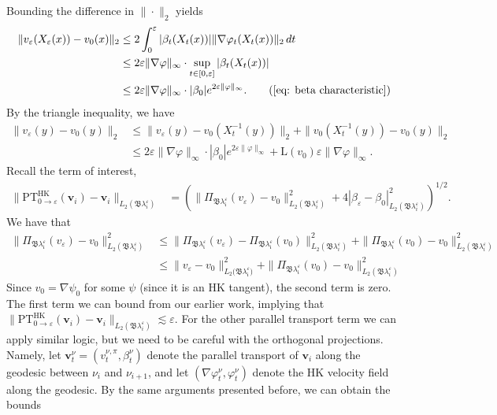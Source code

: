 \documentclass[11pt]{article}
\begin{document}
Bounding the difference in $\|\cdot\|_2$ yields
\begin{align*}
    \|v_\varepsilon(X_\varepsilon(x)) - v_0(x)\|_2 &\leq 2\int_0^\varepsilon|\beta_t(X_t(x))|\|\nabla\varphi_t(X_t(x))\|_2 \,dt \\
    &\leq 2\varepsilon \|\nabla \varphi\|_\infty \cdot \sup_{t\in [0, \varepsilon]}|\beta_t(X_t(x))| \\
    &\leq 2\varepsilon \|\nabla \varphi\|_\infty \cdot |\beta_0|e^{2\varepsilon\|\varphi\|_\infty}. \tag{\Cref{eq: beta characteristic}}
\end{align*}
By the triangle inequality, we have 
\begin{align*}
    \|v_{\varepsilon}(y) - v_0(y)\|_2 &\leq \|v_{\varepsilon}(y) - v_0(X^{-1}_t(y))\|_2 + \|v_0(X^{-1}_t(y)) - v_0(y)\|_2 \\
    &\leq 2\varepsilon \|\nabla \varphi\|_\infty \cdot |\beta_0|e^{2\varepsilon\|\varphi\|_\infty} + \text{L}(v_0)\varepsilon\|\nabla\varphi\|_\infty. 
\end{align*}
Recall the term of interest,
\begin{align*}
    \|\text{PT}^{\text{HK}}_{0 \rightarrow \varepsilon}(\mathbf{v}_i) - \mathbf{v}_i\|_{L_2(\mathfrak{B}\lambda_i^\varepsilon)} &= \left(\|\Pi_{\mathfrak{B\lambda_i^\varepsilon}}(v_\varepsilon) - v_0\|_{L_2(\mathfrak{B}\lambda_i^\varepsilon)}^2 + 4|\beta_\varepsilon - \beta_0|^2_{L_2(\mathfrak{B}\lambda_i^\varepsilon)}\right)^{1/2}.
\end{align*}
We have that 
\begin{align*}
    \|\Pi_{\mathfrak{B\lambda_i^\varepsilon}}(v_\varepsilon) - v_0\|_{L_2(\mathfrak{B}\lambda_i^\varepsilon)}^2 & \leq \|\Pi_{\mathfrak{B\lambda_i^\varepsilon}}(v_\varepsilon) - \Pi_{\mathfrak{B\lambda_i^\varepsilon}}(v_0)\|_{L_2(\mathfrak{B}\lambda_i^\varepsilon)}^2 + \|\Pi_{\mathfrak{B\lambda_i^\varepsilon}}(v_0) - v_0\|_{L_2(\mathfrak{B}\lambda_i^\varepsilon)}^2 \\
    &\leq \|v_{\varepsilon} - v_0\|_{L_2(\mathfrak{B\lambda_i^\varepsilon)}}^2 + \|\Pi_{\mathfrak{B\lambda_i^\varepsilon}}(v_0) - v_0\|_{L_2(\mathfrak{B}\lambda_i^\varepsilon)}^2\tag{non-expansiveness}
\end{align*}
Since $v_0 = \nabla \psi_0$ for some $\psi$ (since it is an HK tangent), the second term is zero. The first term we can bound from our earlier work, implying that $\|\text{PT}^{\text{HK}}_{0 \rightarrow \varepsilon}(\mathbf{v}_i) - \mathbf{v}_i\|_{L_2(\mathfrak{B}\lambda_i^\varepsilon)} \lesssim \varepsilon$. For the other parallel transport term we can apply similar logic, but we need to be careful with the orthogonal projections. Namely, let $\mathbf{v}_t^\nu = (v_t^{\nu, \pi}, \beta_t^\nu)$ denote the parallel transport of $\mathbf{v}_i$ along the geodesic between $\nu_i$ and $\nu_{i +1}$, and let $(\nabla \varphi_t^\nu, \varphi_t^\nu)$ denote the HK velocity field along the geodesic. By the same arguments presented before, we can obtain the bounds
\end{document}
